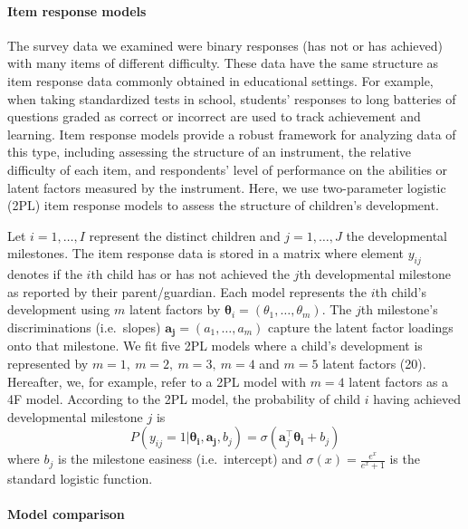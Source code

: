 \documentclass[man, floatsintext]{apa7}
\begin{document}
\paragraph{Item response models}

The survey data we examined were binary responses (has not or has achieved) with
many items of different difficulty. These data have the same structure as item
response data commonly obtained in educational settings. For example,
when taking standardized tests in school, students' responses to long
batteries of questions graded as correct or incorrect are used to track
achievement and learning. Item response models provide a robust framework for analyzing data of this type, including assessing the structure of an instrument, the relative difficulty of
each item, and respondents' level of performance on the abilities or
latent factors measured by the instrument. Here, we use
two-parameter logistic (2PL) item response models to assess the
structure of children's development.

Let $i = 1, \ldots, I$ represent the distinct children and
$j = 1, \ldots, J$ the developmental milestones. The item response
data is stored in a matrix where element $y_{ij}$ denotes if the
$i$th child has or has not achieved the $j$th developmental
milestone as reported by their parent/guardian. Each model represents
the $i$th child's development using $m$ latent factors by
$\boldsymbol{\theta}_{i}=(\theta_1, \dots, \theta_m)$. The $j$th
milestone's discriminations (i.e.~slopes)
$\boldsymbol{a_j}=(a_1, \dots, a_m)$ capture the latent factor
loadings onto that milestone. We fit five 2PL models where a child's
development is represented by $m = 1, \ m = 2, \ m = 3, \ m = 4$ and
$m = 5$ latent factors (20). Hereafter, we, for example, refer to a
2PL model with $m = 4$ latent factors as a 4F model. According to the
2PL model, the probability of child $i$ having achieved  developmental
milestone $j$ is \begin{equation}\label{eq:irt}
P(y_{ij} = 1 | \boldsymbol{\theta_i}, \boldsymbol{a_j}, b_j) = \sigma(\boldsymbol{a}_{j}^{\top}\boldsymbol{\theta_i} + b_j)
\end{equation} where $b_j$ is the milestone easiness (i.e.~intercept)
and $\sigma(x) = \frac{e^x}{e^x + 1}$ is the standard logistic
function. 

\paragraph{Model comparison}
\end{document}
